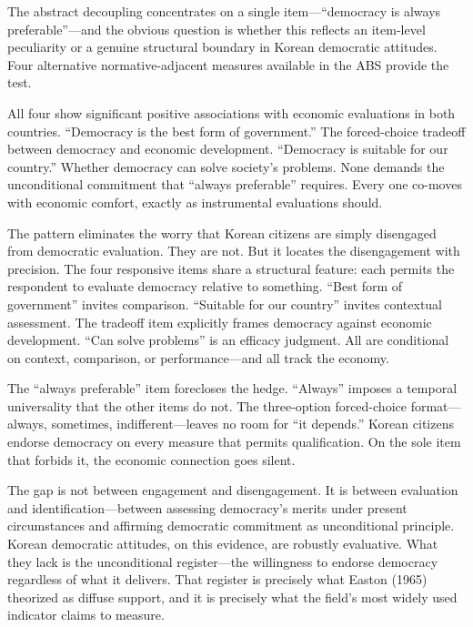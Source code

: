 \documentclass[
  12pt,
  12pt,
  letterpaper]{article}
\begin{document}
The abstract decoupling concentrates on a single item---``democracy is
always preferable''---and the obvious question is whether this reflects
an item-level peculiarity or a genuine structural boundary in Korean
democratic attitudes. Four alternative normative-adjacent measures
available in the ABS provide the test.

All four show significant positive associations with economic
evaluations in both countries. ``Democracy is the best form of
government.'' The forced-choice tradeoff between democracy and economic
development. ``Democracy is suitable for our country.'' Whether
democracy can solve society's problems. None demands the unconditional
commitment that ``always preferable'' requires. Every one co-moves with
economic comfort, exactly as instrumental evaluations should.

The pattern eliminates the worry that Korean citizens are simply
disengaged from democratic evaluation. They are not. But it locates the
disengagement with precision. The four responsive items share a
structural feature: each permits the respondent to evaluate democracy
relative to something. ``Best form of government'' invites comparison.
``Suitable for our country'' invites contextual assessment. The tradeoff
item explicitly frames democracy against economic development. ``Can
solve problems'' is an efficacy judgment. All are conditional on
context, comparison, or performance---and all track the economy.

The ``always preferable'' item forecloses the hedge. ``Always'' imposes
a temporal universality that the other items do not. The three-option
forced-choice format---always, sometimes, indifferent---leaves no room
for ``it depends.'' Korean citizens endorse democracy on every measure
that permits qualification. On the sole item that forbids it, the
economic connection goes silent.

The gap is not between engagement and disengagement. It is between
evaluation and identification---between assessing democracy's merits
under present circumstances and affirming democratic commitment as
unconditional principle. Korean democratic attitudes, on this evidence,
are robustly evaluative. What they lack is the unconditional
register---the willingness to endorse democracy regardless of what it
delivers. That register is precisely what Easton (1965) theorized as
diffuse support, and it is precisely what the field's most widely used
indicator claims to measure.
\end{document}
